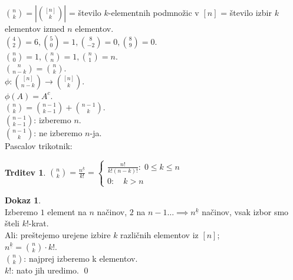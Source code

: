 \documentclass[a4paper, 12pt]{book}
\theoremstyle{definition}
\newtheorem{claim}[counter]{Trditev}
\newtheorem{pro}[counter]{Dokaz}
\theoremstyle{remark}
\begin{document}
$\binom{n}{k} = \left|\binom{[n]}{k}\right|$ = število $k$-elementnih podmnožic v $[n]$
= število izbir $k$ elementov izmed $n$ elementov. \\
$\binom{4}{2} = 6, \binom{5}{0} = 1, \binom{8}{-2} = 0, \binom{8}{9} = 0$. \\
$\binom{n}{0} = 1, \binom{n}{n} = 1, \binom{n}{1} = n$. \\
$\binom{n}{n-k} = \binom{n}{k}$. \\
$\phi: \binom{[n]}{n-k} \to \binom{[n]}{k}$. \\
$\phi(A) = A^c$. \\
$\binom{n}{k} = \binom{n-1}{k-1} + \binom{n-1}{k}$. \\
$\binom{n-1}{k-1}$: izberemo $n$. \\
$\binom{n-1}{k}$: ne izberemo $n$-ja. \\
Pascalov trikotnik: \\
\begin{claim}
  $\binom{n}{k} = \frac{n^{\underline{k}}}{k!} = \begin{cases}
    \frac{n!}{k! (n-k)!}: \; 0 \leq k \leq n \\
    0: \quad k > n
  \end{cases}$
\end{claim}
\begin{pro} \text{} \\
  Izberemo $1$ element na $n$ načinov, $2$ na $n-1 \dots \implies n^{\underline{k}}$ načinov,
  vsak izbor smo šteli $k!$-krat. \\
  Ali: preštejemo urejene izbire $k$ različnih elementov iz $[n]$; \\
  $n^{\underline{k}} = \binom{n}{k} \cdot k!$. \\
  $\binom{n}{k}$: najprej izberemo k elementov. \\
  $k!$: nato jih uredimo.
  \qed
\end{pro}
\end{document}
